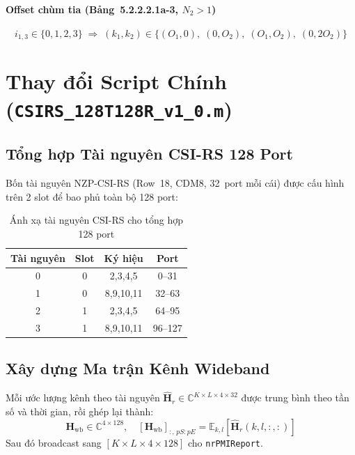 \documentclass[11pt,a4paper]{article}
\begin{document}
\paragraph{Offset chùm tia (Bảng~5.2.2.2.1a-3, $N_2 > 1$)}
\begin{equation}
  i_{1,3} \in \{0,1,2,3\} \;\Rightarrow\;
  (k_1,k_2) \in \{(O_1,0),\;(0,O_2),\;(O_1,O_2),\;(0,2O_2)\}
\end{equation}

\section{Thay đổi Script Chính (\texttt{CSIRS\_128T128R\_v1\_0.m})}

\subsection{Tổng hợp Tài nguyên CSI-RS 128 Port}

Bốn tài nguyên NZP-CSI-RS (Row~18, CDM8, 32~port mỗi cái) được cấu hình
trên 2 slot để bao phủ toàn bộ 128 port:

\begin{table}[htbp]
\centering
\caption{Ánh xạ tài nguyên CSI-RS cho tổng hợp 128 port}
\begin{tabular}{cccc}
\toprule
Tài nguyên & Slot & Ký hiệu & Port \\
\midrule
0 & 0 & 2,3,4,5 & 0--31 \\
1 & 0 & 8,9,10,11 & 32--63 \\
2 & 1 & 2,3,4,5 & 64--95 \\
3 & 1 & 8,9,10,11 & 96--127 \\
\bottomrule
\end{tabular}
\end{table}

\subsection{Xây dựng Ma trận Kênh Wideband}

Mỗi ước lượng kênh theo tài nguyên
$\hat{\mathbf{H}}_r \in \mathbb{C}^{K \times L \times 4 \times 32}$
được trung bình theo tần số và thời gian, rồi ghép lại thành:
\begin{equation}
  \mathbf{H}_\text{wb} \in \mathbb{C}^{4 \times 128}, \quad
  [\mathbf{H}_\text{wb}]_{:,\,pS:pE} =
    \mathbb{E}_{k,l}\left[\hat{\mathbf{H}}_r(k,l,:,:)\right]
\end{equation}
Sau đó broadcast sang $[K \times L \times 4 \times 128]$ cho \texttt{nrPMIReport}.
\end{document}

